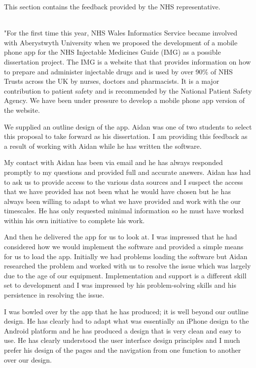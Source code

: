 This section contains the feedback provided by the NHS representative.
\\
\\
\begin{itshape}
"For the first time this year, NHS Wales Informatics Service became involved with Aberystwyth University when we proposed the development of a mobile phone app for the NHS Injectable Medicines Guide (IMG) as a possible dissertation project. The IMG is a website that that provides information on how to prepare and administer injectable drugs and is used by over 90\% of NHS Trusts across the UK by nurses, doctors and pharmacists. It is a major contribution to patient safety and is recommended by the National Patient Safety Agency. We have been under pressure to develop a mobile phone app version of the website.

We supplied an outline design of the app. Aidan was one of two students to select this proposal to take forward as his dissertation. I am providing this feedback as a result of working with Aidan while he has written the software.

My contact with Aidan has been via email and he has always responded promptly to my questions and provided full and accurate answers. Aidan has had to ask us to provide access to the various data sources and I suspect the access that we have provided has not been what he would have chosen but he has always been willing to adapt to what we have provided and work with the our timescales. He has only requested minimal information so he must have worked within his own initiative to complete his work.

And then he delivered the app for us to look at. I was impressed that he had considered how we would implement the software and provided a simple means for us to load the app. Initially we had problems loading the software but Aidan researched the problem and worked with us to resolve the issue which was largely due to the age of our equipment. Implementation and support is a different skill set to development and I was impressed by his problem-solving skills and his persistence in resolving the issue. 

I was bowled over by the app that he has produced; it is well beyond our outline design. He has clearly had to adapt what was essentially an iPhone design to the Android platform and he has produced a design that is very clean and easy to use. He has clearly understood the user interface design principles and I much prefer his design of the pages and the navigation from one function to another over our design.


\end{itshape}
